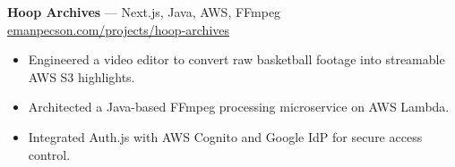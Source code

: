 
\textbf{Hoop Archives} — Next.js, Java, AWS, FFmpeg \\
\href{https://emanpecson.com/projects/hoop-archives}{emanpecson.com/projects/hoop-archives}
\begin{itemize}[leftmargin=*, nosep]
  \item Engineered a video editor to convert raw basketball footage into streamable AWS S3 highlights.
  \item Architected a Java-based FFmpeg processing microservice on AWS Lambda.
  \item Integrated Auth.js with AWS Cognito and Google IdP for secure access control.
\end{itemize}
